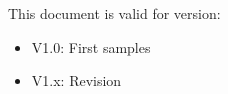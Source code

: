 This document is valid for \aschip \; version:
\begin{itemize}
  \item V1.0: First samples
  \item V1.x: Revision
\end{itemize}
